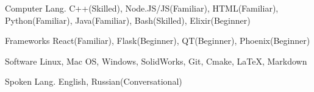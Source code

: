 

\begin{cvskills}

  \cvskill
    {Computer Lang.} %
    {C++(Skilled), Node.JS/JS(Familiar), HTML(Familiar), Python(Familiar), Java(Familiar), Bash(Skilled), Elixir(Beginner)} %

\cvskill
  {Frameworks} %
  {React(Familiar), Flask(Beginner), QT(Beginner), Phoenix(Beginner)} %

  \cvskill
    {Software} %
    {Linux, Mac OS, Windows, SolidWorks, Git, Cmake, LaTeX, Markdown} %

  \cvskill
    {Spoken Lang.} %
    {English, Russian(Conversational)} %

\end{cvskills}
